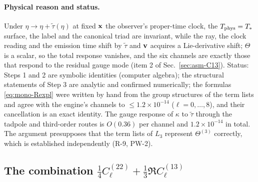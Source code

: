 \paragraph{Physical reason and status.}  Under $\eta\to\eta+\tilde\tau(\eta)$ at fixed $\mathbf x$ the observer's proper-time clock, the $T_{\rm phys}=T_*$ surface,
the label and the canonical triad are invariant, while the ray, the clock reading and the emission time shift by $\tilde\tau$ and $\mathbf v$ acquires a
Lie-derivative shift; $\Theta$ is a scalar, so the total response vanishes, and the six channels are exactly those that respond to the residual
gauge mode (item 2 of Sec.~\ref{sec:asm-C13}).  Status: Steps 1 and 2 are symbolic identities (computer algebra); the structural statements of
Step 3 are analytic and confirmed numerically; the formulas \eqref{eq:mono-Rexpl} were written by hand from the group structures of the term lists
and agree with the engine's channels to $\le1.2\times10^{-14}$ ($\ell=0,\dots,8$), and their cancellation is an exact identity.  The gauge response of
$\kappa$ to $\tilde\tau$ through the tadpole and third-order routes is $O(0.36)$ per channel and $1.2\times10^{-14}$ in total.  The argument
presupposes that the term lists of $L_3$ represent $\Theta^{(3)}$ correctly, which is established independently (R-9, PW-2).

\subsection{The combination \texorpdfstring{$\tfrac14C^{(22)}_\ell+\tfrac13\Re C^{(13)}_\ell$}{1/4 C22 + 1/3 Re C13}}
\label{sec:mono-comb}
